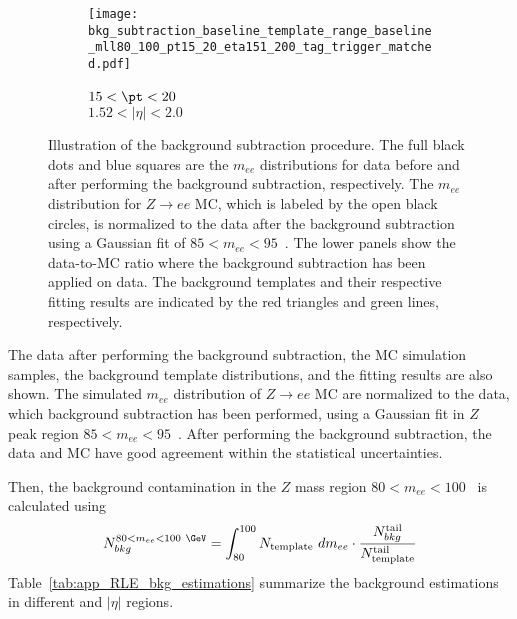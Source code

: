 \begin{figure}[ht]
\begin{subfigure}[b]{0.32\textwidth}
    \end{subfigure}
    \begin{subfigure}[b]{0.32\textwidth}
        \begin{center}
            \texttt{[image: bkg\_subtraction\_baseline\_template\_range\_baseline\_mll80\_100\_pt15\_20\_eta151\_200\_tag\_trigger\_matched.pdf]}
            \caption{$15 < \pt < 20$~{\GeV}\\$1.52<|\eta|<2.0$}
        \end{center}
    \end{subfigure}
    \caption{Illustration of the background subtraction procedure.
    The full black dots and blue squares are the $m_{ee}$ distributions for data before and after performing the background subtraction, respectively.
    The $m_{ee}$ distribution for $Z \to ee$ MC, which is labeled by the open black circles, is normalized to the data after the background subtraction using a Gaussian fit of $85 < m_{ee} < 95$~{\GeV}.
    The lower panels show the data-to-MC ratio where the background subtraction has been applied on data.
    The background templates and their respective fitting results are indicated by the red triangles and green lines, respectively.
    }
    \label{fig:app_RLE_bkg_estimations}
\end{figure}
%
The data after performing the background subtraction, the MC simulation samples, the background template distributions, and the fitting results are also shown.
The simulated $m_{ee}$ distribution of $Z \to ee$ MC are normalized to the data, which background subtraction has been performed, using a Gaussian fit in $Z$ peak region $85 < m_{ee} < 95$~{\GeV}.
After performing the background subtraction, the data and MC have good agreement within the statistical uncertainties.

Then, the background contamination in the $Z$ mass region $80 < m_{ee} < 100$~{\GeV} is calculated using
%
\begin{equation}
    N_{bkg}^{80 < m_{ee} < 100~{\GeV}} = \int_{80}^{100} N_\mathrm{template} \ dm_{ee} \cdot \frac{N_{bkg}^\mathrm{tail}}{N_\mathrm{template}^\mathrm{tail}}
    \label{eq:RLE_bkg_in_80_mll_100}
\end{equation}
%
Table~\ref{tab:app_RLE_bkg_estimations} summarize the background estimations in different \pt and $|\eta|$ regions.

